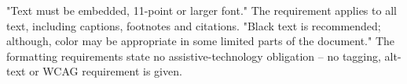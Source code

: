 %


%


	{"Text must be embedded, 11-point or larger font." The requirement applies
	 to all text, including captions, footnotes and citations.}
	{"Black text is recommended; although, color may be appropriate in some
	 limited parts of the document."}
	{The formatting requirements state no assistive-technology obligation --
	 no tagging, alt-text or WCAG requirement is given.}
